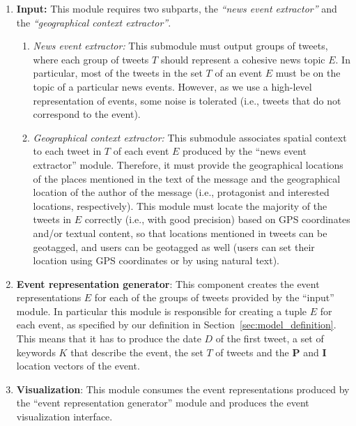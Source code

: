 \begin{enumerate}

\item{\bf Input:} 
%
This module requires two subparts, the {\em ``news event extractor''} and the
{\em ``geographical context extractor''}.
%
    \begin{enumerate}
    \item{\em News event extractor:} 
    This submodule must output groups of tweets, where each group of tweets $T$
    should represent a cohesive news topic $E$.  
    In particular, most of the tweets in the set $T$ of an event $E$ must be on
    the topic of a particular news events. 
    However, as we use a high-level representation of events, some noise is
    tolerated (i.e., tweets that do not correspond to the event).

    \item{\em Geographical context extractor:} 
    This submodule associates spatial context to each tweet in $T$ of each event
    $E$ produced by the ``news event extractor'' module. 
    Therefore, it must provide the geographical locations of the places
    mentioned in the text of the message and the geographical location of the
    author of the message (i.e., protagonist and interested locations,
    respectively). 
    This module must locate the majority of the tweets in $E$ correctly (i.e.,
    with good precision) based on GPS coordinates and/or textual content, so
    that locations mentioned in tweets can be geotagged, and users can be
    geotagged as well (users can set their location using GPS coordinates or by
    using natural text).

    \end{enumerate}
%
\item{\bf Event representation generator}: 
%
This component creates the event representations $E$ for each of the groups of
tweets provided by the ``input'' module. 
%
In particular this module is responsible for creating a tuple $E$ for each
event, as specified by our definition in Section~\ref{sec:model_definition}.
%
This means that it has to produce the date $D$ of the first tweet, a set of
keywords $K$ that describe the event, the set $T$ of tweets and the $\mathbf{P}$
and $\mathbf{I}$ location vectors of the event.


\item{\bf Visualization}: 
%
This module consumes the event representations
produced by the ``event representation generator'' module and produces the event
visualization interface.

\end{enumerate}



